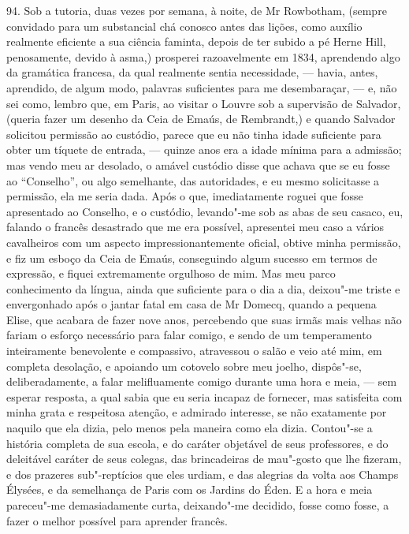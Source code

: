 94. Sob a tutoria, duas vezes por semana, à noite, de Mr Rowbotham,
(sempre convidado para um substancial chá conosco antes das lições, como
auxílio realmente eficiente a sua ciência faminta, depois de ter subido
a pé Herne Hill, penosamente, devido à asma,) prosperei razoavelmente em
1834, aprendendo algo da gramática francesa, da qual realmente sentia
necessidade, --- havia, antes, aprendido, de algum modo, palavras
suficientes para me desembaraçar, --- e, não sei como, lembro que, em
Paris, ao visitar o Louvre sob a supervisão de Salvador, (queria fazer
um desenho da Ceia de Emaús, de Rembrandt,) e quando Salvador solicitou
permissão ao custódio, parece que eu não tinha idade suficiente para
obter um tíquete de entrada, --- quinze anos era a idade mínima para a
admissão; mas vendo meu ar desolado, o amável custódio disse que achava
que se eu fosse ao ``Conselho'', ou algo semelhante, das autoridades, e
eu mesmo solicitasse a permissão, ela me seria dada. Após o que,
imediatamente roguei que fosse apresentado ao Conselho, e o custódio,
levando"-me sob as abas de seu casaco, eu, falando o francês desastrado
que me era possível, apresentei meu caso a vários cavalheiros com um
aspecto impressionantemente oficial, obtive minha permissão, e fiz um
esboço da Ceia de Emaús, conseguindo algum sucesso em termos de
expressão, e fiquei extremamente orgulhoso de mim. Mas meu parco
conhecimento da língua, ainda que suficiente para o dia a dia, deixou"-me
triste e envergonhado após o jantar fatal em casa de Mr Domecq, quando a
pequena Elise, que acabara de fazer nove anos, percebendo que suas irmãs
mais velhas não fariam o esforço necessário para falar comigo, e sendo
de um temperamento inteiramente benevolente e compassivo, atravessou o
salão e veio até mim, em completa desolação, e apoiando um cotovelo
sobre meu joelho, dispôs"-se, deliberadamente, a falar melifluamente
comigo durante uma hora e meia, --- sem esperar resposta, a qual sabia
que eu seria incapaz de fornecer, mas satisfeita com minha grata e
respeitosa atenção, e admirado interesse, se não exatamente por naquilo
que ela dizia, pelo menos pela maneira como ela dizia. Contou"-se a
história completa de sua escola, e do caráter objetável de seus
professores, e do deleitável caráter de seus colegas, das brincadeiras
de mau"-gosto que lhe fizeram, e dos prazeres sub"-reptícios que eles
urdiam, e das alegrias da volta aos Champs Élysées, e da semelhança de
Paris com os Jardins do Éden. E a hora e meia pareceu"-me demasiadamente
curta, deixando"-me decidido, fosse como fosse, a fazer o melhor possível
para aprender francês.

